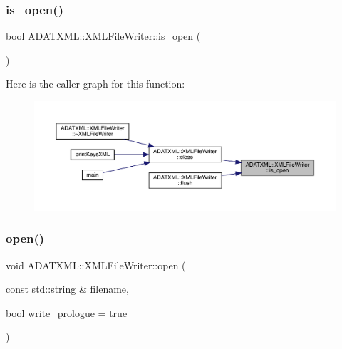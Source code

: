 \mbox{\label{classADATXML_1_1XMLFileWriter_a60fa87bbd9300c37386f9fdcb9460f74}} 
\subsubsection{\texorpdfstring{is\_open()}{is\_open()}\hspace{0.1cm}{\footnotesize\ttfamily [2/2]}}
{\footnotesize\ttfamily bool A\+D\+A\+T\+X\+M\+L\+::\+X\+M\+L\+File\+Writer\+::is\+\_\+open (\begin{DoxyParamCaption}{ }\end{DoxyParamCaption})}

Here is the caller graph for this function\+:
\nopagebreak
\begin{figure}[H]
\begin{center}
\leavevmode
\includegraphics[width=350pt]{d6/ddb/classADATXML_1_1XMLFileWriter_a60fa87bbd9300c37386f9fdcb9460f74_icgraph}
\end{center}
\end{figure}
\mbox{\label{classADATXML_1_1XMLFileWriter_a76f52e7ccdfe3b82875f30953cfd2447}} 
\subsubsection{\texorpdfstring{open()}{open()}\hspace{0.1cm}{\footnotesize\ttfamily [1/2]}}
{\footnotesize\ttfamily void A\+D\+A\+T\+X\+M\+L\+::\+X\+M\+L\+File\+Writer\+::open (\begin{DoxyParamCaption}\item[{const std\+::string \&}]{filename,  }\item[{bool}]{write\+\_\+prologue = {\ttfamily true} }\end{DoxyParamCaption})\hspace{0.3cm}{\ttfamily [inline]}}

